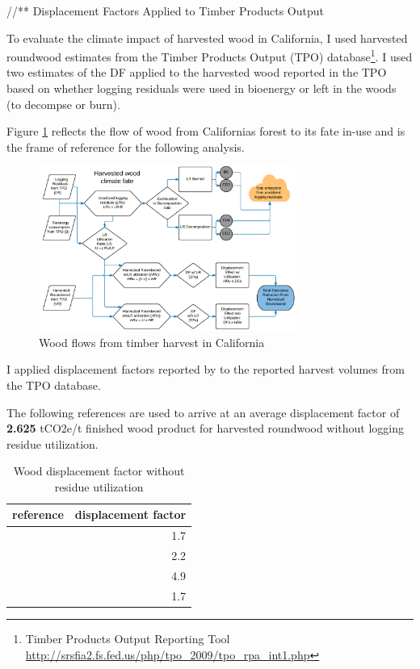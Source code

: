 \documentclass[a4paper]{article}
\begin{document}
//** Displacement Factors Applied to Timber Products Output

To evaluate the climate impact of harvested wood in California, I used
harvested roundwood estimates from the Timber Products Output (TPO)
database\footnote{Timber Products Output Reporting Tool \href{http://srsfia2.fs.fed.us/php/tpo_2009/tpo_rpa_int1.php}{\url{http://srsfia2.fs.fed.us/php/tpo_2009/tpo_rpa_int1.php}}}. I used two estimates of the DF applied
to the harvested wood reported in the TPO based on whether logging
residuals were used in bioenergy or left in the woods (to decompse or
burn).

Figure \ref{fig:flow_chart} reflects the flow of wood
from Californias forest to its fate in-use and is the frame of
reference for the following analysis.

\begin{figure}[htb]
\centering
\includegraphics[width=0.75\textwidth]{./graphics/flow_chart.pdf}
\caption{Wood flows from timber harvest in California \label{fig:flow_chart}}
\end{figure}

I applied displacement factors reported by \cite{Sathre2010} to the
reported harvest volumes from the TPO database. 


The following references are used to
arrive at an average displacement factor of \textbf{2.625} tCO2e/t finished
wood product for harvested roundwood without
logging residue utilization.

\begin{table}[htb]
\centering
\begin{tabular}{lr}
reference & displacement factor\\
\hline
\citet{Eriksson2007} & 1.7\\
\citet{Eriksson2007} & 2.2\\
\citet{Salazar2009} & 4.9\\
\citet{Werner2005} & 1.7\\
\end{tabular}
\caption{Wood displacement factor without residue utilization \label{tab:df_no_use}}

\end{table}
\end{document}
